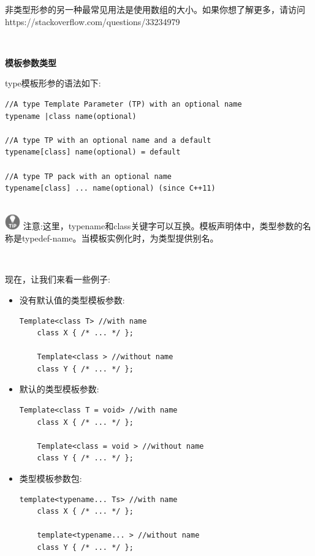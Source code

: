 非类型形参的另一种最常见用法是使用数组的大小。如果你想了解更多，请访问\\ https://stackoverflow.com/questions/​33234979 

\noindent\textbf{}\ \par
\textbf{模板参数类型} \ \par
type模板形参的语法如下: \par

\begin{lstlisting}[caption={}]
//A type Template Parameter (TP) with an optional name
typename |class name(optional)

//A type TP with an optional name and a default
typename[class] name(optional) = default

//A type TP pack with an optional name
typename[class] ... name(optional) (since C++11)
\end{lstlisting}

\hspace*{\fill} \\ %
\includegraphics[width=0.05\textwidth]{images/tip}
注意:这里，typename和class关键字可以互换。模板声明体中，类型参数的名称是typedef-name。当模板实例化时，为类型提供别名。 \par
\noindent\textbf{}\ \par

现在，让我们来看一些例子: \par

\begin{itemize}
	\item 没有默认值的类型模板参数: \par
	\begin{lstlisting}[caption={}]
	Template<class T> //with name
	class X { /* ... */ };
	
	Template<class > //without name
	class Y { /* ... */ };
	\end{lstlisting}
	\item 默认的类型模板参数: \par
	\begin{lstlisting}[caption={}]
	Template<class T = void> //with name
	class X { /* ... */ };
	
	Template<class = void > //without name
	class Y { /* ... */ };
	\end{lstlisting}
	\item 类型模板参数包: \par
	\begin{lstlisting}[caption={}]
	template<typename... Ts> //with name
	class X { /* ... */ };
	
	template<typename... > //without name
	class Y { /* ... */ };
	\end{lstlisting}
\end{itemize}

